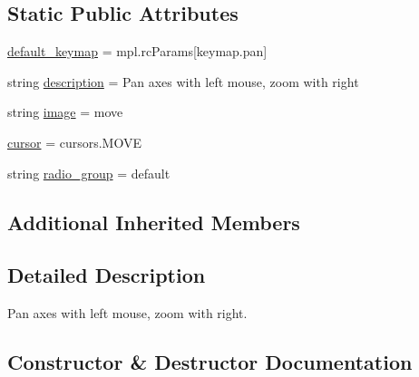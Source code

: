 \subsection*{Static Public Attributes}
\begin{DoxyCompactItemize}
\item 
\hyperlink{classmatplotlib_1_1backend__tools_1_1ToolPan_a06b264765996fac1eb37b6c2bd2a4391}{default\+\_\+keymap} = mpl.\+rc\+Params\mbox{[}\textquotesingle{}keymap.\+pan\textquotesingle{}\mbox{]}
\item 
string \hyperlink{classmatplotlib_1_1backend__tools_1_1ToolPan_abdbd675a192153fb6d71e7196682e06a}{description} = \textquotesingle{}Pan axes with left mouse, zoom with right\textquotesingle{}
\item 
string \hyperlink{classmatplotlib_1_1backend__tools_1_1ToolPan_adeb8294e31d501f4f8ca9a1656ab5a7b}{image} = \textquotesingle{}move\textquotesingle{}
\item 
\hyperlink{classmatplotlib_1_1backend__tools_1_1ToolPan_af33c4b1eaefc1b612ac28802c1cf2db5}{cursor} = cursors.\+M\+O\+VE
\item 
string \hyperlink{classmatplotlib_1_1backend__tools_1_1ToolPan_a0696296f161e3d02fcbb703e22e1db61}{radio\+\_\+group} = \textquotesingle{}default\textquotesingle{}
\end{DoxyCompactItemize}
\subsection*{Additional Inherited Members}


\subsection{Detailed Description}
\begin{DoxyVerb}Pan axes with left mouse, zoom with right.\end{DoxyVerb}
 

\subsection{Constructor \& Destructor Documentation}
\mbox{\label{classmatplotlib_1_1backend__tools_1_1ToolPan_a21261e1a6eec72e19f3fd9c37dae6e48}} 
